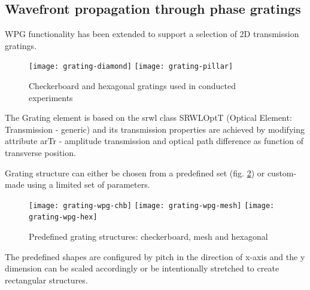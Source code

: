 \documentclass[10pt]{scrartcl}
\begin{document}
\subsection{Wavefront propagation through phase gratings}
\label{sec:wpg_phasegrating}
WPG functionality has been extended to support a selection of 2D transmission gratings.
%
\begin{figure}[ht]
	\begin{center}
		\texttt{[image: grating-diamond]}
		\texttt{[image: grating-pillar]}
	\end{center}
	\caption{Checkerboard and hexagonal gratings used in conducted experiments}
	\label{fig:lm_gratings}
\end{figure}
%
The Grating element is based on the srwl class SRWLOptT (Optical Element: Transmission - generic) and its transmission properties are achieved by modifying attribute arTr - amplitude transmission and optical path difference as function of transverse position.

Grating structure can either be chosen from a predefined set (fig. \ref{fig:lm_predef}) or custom-made using a limited set of parameters.
%
\begin{figure}[ht]
	\begin{center}
		\texttt{[image: grating-wpg-chb]}
		\texttt{[image: grating-wpg-mesh]}				\texttt{[image: grating-wpg-hex]}
	\end{center}
	\caption{Predefined grating structures: checkerboard, mesh and hexagonal}
	\label{fig:lm_predef}
\end{figure}
%
The predefined shapes are configured by pitch in the direction of x-axis and the y dimension can be scaled accordingly or be intentionally stretched to create rectangular structures.
\end{document}
